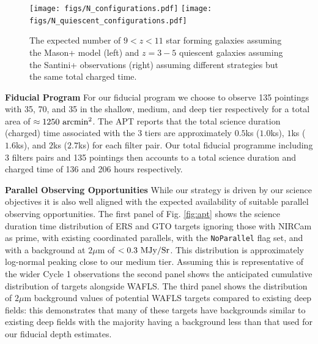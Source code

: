 \documentclass[12pt]{article}
\begin{document}
\begin{figure}
    \centering
    \texttt{[image: figs/N\_configurations.pdf]}
    \texttt{[image: figs/N\_quiescent\_configurations.pdf]}
    \caption{The expected number of $9<z<11$ star forming galaxies assuming the Mason+ model (left) and $z=3-5$ quiescent galaxies assuming the Santini+ observations (right) assuming different strategies but the same total charged time.}
    \label{fig:strategy}
\end{figure}


\noindent
\textbf{Fiducial Program} For our fiducial program we choose to observe 135 pointings with 35, 70, and 35 in the shallow, medium, and deep tier respectively for a total area of $\approx 1250\ {\rm arcmin}^2$. 
The APT reports that the total science duration (charged) time associated with the 3 tiers are approximately $0.5$ks ($1.0$ks), $1$ks ($1.6$ks), and $2$ks ($2.7$ks) for each filter pair. Our total fiducial programme including 3 filters pairs and 135 pointings then accounts to a total science duration and charged time of 136 and 206 hours respectively. 

\noindent
\textbf{Parallel Observing Opportunities} While our strategy is driven by our science objectives it is also well aligned with the expected availability of suitable parallel observing opportunities. The first panel of Fig. \ref{fig:apt} shows the science duration time distribution of ERS and GTO targets ignoring those with NIRCam as prime, with existing coordinated parallels, with the \texttt{NoParallel} flag set,  and with a background at $2\mu$m of $<0.3\ {\rm MJy/Sr}$. This distribution is approximately log-normal peaking close to our medium tier. Assuming this is representative of the wider Cycle 1 observations the second panel shows the anticipated cumulative distribution of targets alongside WAFLS. The third panel shows the distribution of $2\mu$m background values of potential WAFLS targets compared to existing deep fields: this demonstrates that many of these targets have backgrounds similar to existing deep fields with the majority having a background less than that used for our fiducial depth estimates.
\end{document}

